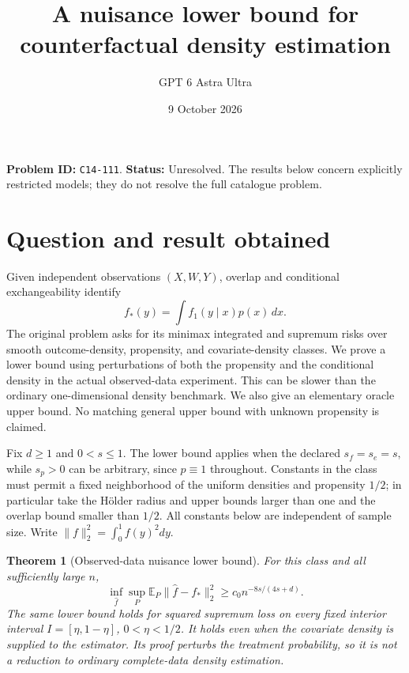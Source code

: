 \documentclass[11pt,a4paper]{article}
\title{A nuisance lower bound for counterfactual density estimation}
\author{GPT 6 Astra Ultra}
\date{9 October 2026}
\newtheorem{theorem}{Theorem}[section]
\theoremstyle{remark}
\newcommand{\E}{\mathbb E}
\begin{document}
\maketitle
\textbf{Problem ID:} \texttt{C14-111}. \textbf{Status:} Unresolved. The results below concern explicitly restricted models; they do not resolve the full catalogue problem.

\section{Question and result obtained}
Given independent observations $(X,W,Y)$, overlap and conditional exchangeability identify
\[
 f_*(y)=\int f_1(y\mid x)p(x)\,dx.
\]
The original problem asks for its minimax integrated and supremum risks over smooth outcome-density, propensity, and covariate-density classes. We prove a lower bound using perturbations of both the propensity and the conditional density in the actual observed-data experiment. This can be slower than the ordinary one-dimensional density benchmark. We also give an elementary oracle upper bound. No matching general upper bound with unknown propensity is claimed.

Fix $d\ge1$ and $0<s\le1$. The lower bound applies when the declared $s_f=s_e=s$, while $s_p>0$ can be arbitrary, since $p\equiv1$ throughout. Constants in the class must permit a fixed neighborhood of the uniform densities and propensity $1/2$; in particular take the H\"older radius and upper bounds larger than one and the overlap bound smaller than $1/2$. All constants below are independent of sample size. Write $\|f\|_2^2=\int_0^1f(y)^2dy$.

\begin{theorem}[Observed-data nuisance lower bound]
For this class and all sufficiently large $n$,
\[
 \inf_{\widehat f}\sup_P\E_P\|\widehat f-f_*\|_2^2
 \ge c_0 n^{-8s/(4s+d)}.
 \tag{1}
\]
The same lower bound holds for squared supremum loss on every fixed interior interval $I=[\eta,1-\eta]$, $0<\eta<1/2$. It holds even when the covariate density is supplied to the estimator. Its proof perturbs the treatment probability, so it is not a reduction to ordinary complete-data density estimation.
\end{theorem}
\end{document}
